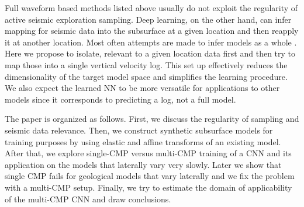 \documentclass[paper,twocolomn]{geophysics}
\begin{document}
Full waveform based methods listed above usually do not exploit the regularity of active seismic exploration sampling. Deep learning, on the other hand, can infer mapping for seismic data into the subsurface at a given location and then reapply it at another location. Most often attempts are made to infer models as a whole \citep{richardson2018seismic, wu2018inversionnet, zhang2018velocitygan, yang2019deep, oye2019velocity}. Here we propose to isolate, relevant to a given location data first and then try to map those into a single vertical velocity log. This set up effectively reduces the dimensionality of the target model space and simplifies the learning procedure. We also expect the learned NN to be more versatile for applications to other models since it corresponds to predicting a log, not a full model.

The paper is organized as follows. First, we discuss the regularity of sampling and seismic data relevance.
%
Then, we construct synthetic subsurface models for training purposes by using elastic and affine transforms of an existing model.
%
After that, we explore single-CMP versus multi-CMP training of a CNN and its application on the models that laterally vary very slowly.
%
Later we show that single CMP fails for geological models that vary laterally and we fix the problem with a multi-CMP setup.
%
Finally, we try to estimate the domain of applicability of the multi-CMP CNN and draw conclusions.
\end{document}
